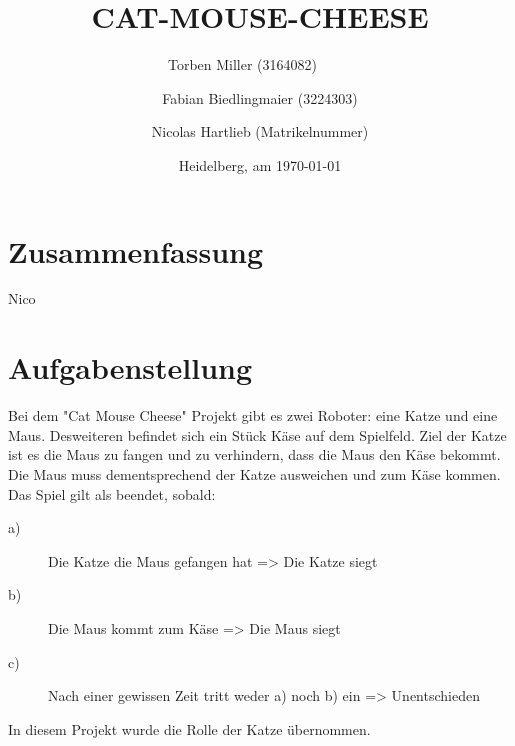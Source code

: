 \documentclass[
a4paper,     %
12pt         %
]{scrartcl}  %
\title{CAT-MOUSE-CHEESE}
\author{Torben Miller (3164082)\ \ \ \ \ \and
Fabian Biedlingmaier (3224303)        \and
Nicolas Hartlieb (Matrikelnummer)}
\date{Heidelberg, am \today{}}
\begin{document}

 \maketitle

 \newpage
 \tableofcontents

 \newpage
 \listoffigures

 \newpage
 \listoftables

 \newpage



\section*{Zusammenfassung}
Nico
\section{Aufgabenstellung}
Bei dem "Cat Mouse Cheese" Projekt gibt es zwei Roboter: eine Katze und eine Maus. Desweiteren befindet sich ein Stück Käse auf dem Spielfeld.
Ziel der Katze ist es die Maus zu fangen und zu verhindern, dass die Maus den Käse bekommt.
Die Maus muss dementsprechend der Katze ausweichen und zum Käse kommen.
Das Spiel gilt als beendet, sobald:
\begin{description}
\item[a)]Die Katze die Maus gefangen hat => Die Katze siegt
\item[b)] Die Maus kommt zum Käse => Die Maus siegt
\item[c)] Nach einer gewissen Zeit tritt weder a) noch b) ein => Unentschieden
\end{description}
In diesem Projekt wurde die Rolle der Katze übernommen.
\end{document}
